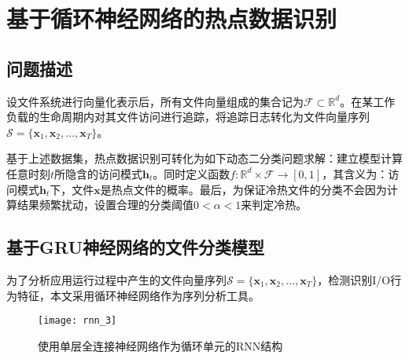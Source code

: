 \section{基于循环神经网络的热点数据识别}
\subsection{问题描述}
%

设文件系统进行向量化表示后，所有文件向量组成的集合记为$\mathcal{F} \subset \mathbb{R}^d$。在某工作负载的生命周期内对其文件访问进行追踪，将追踪日志转化为文件向量序列$\mathcal{S}=\{\mathbf{x}_1, \mathbf{x}_2,\dots, \mathbf{x}_T\}$。

基于上述数据集，热点数据识别可转化为如下动态二分类问题求解：建立模型计算任意时刻$t$所隐含的访问模式$\mathbf{h}_t$。同时定义函数$f:\mathbb{R}^d \times \mathcal{F} \rightarrow [0,1]$，其含义为：访问模式$\mathbf{h}_t$下，文件$\mathbf{x}$是热点文件的概率。最后，为保证冷热文件的分类不会因为计算结果频繁扰动，设置合理的分类阈值$0<\alpha<1$来判定冷热。


\subsection{基于GRU神经网络的文件分类模型}
为了分析应用运行过程中产生的文件向量序列$\mathcal{S}=\{\mathbf{x}_1, \mathbf{x}_2,\dots, \mathbf{x}_T\}$，检测识别I/O行为特征，本文采用循环神经网络作为序列分析工具。
\begin{figure}[htp]
\centering
\texttt{[image: rnn\_3]}
\caption{使用单层全连接神经网络作为循环单元的RNN结构}
\label{fig:rnn_3}
\end{figure}

